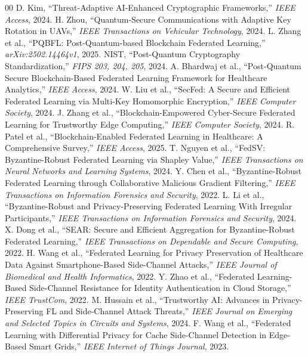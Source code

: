 \documentclass[journal, 10pt, twocolumn]{IEEEtran}
\begin{document}
\begin{thebibliography}{00}
 D. Kim, ``Threat-Adaptive AI-Enhanced Cryptographic Frameworks,'' \textit{IEEE Access}, 2024.
 H. Zhou, ``Quantum-Secure Communications with Adaptive Key Rotation in UAVs,'' \textit{IEEE Transactions on Vehicular Technology}, 2024.
 L. Zhang et al., ``PQBFL: Post-Quantum-based Blockchain Federated Learning,'' \textit{arXiv:2502.14464v1}, 2025.
 NIST, ``Post-Quantum Cryptography Standardization,'' \textit{FIPS 203, 204, 205}, 2024.
 A. Bhardwaj et al., ``Post-Quantum Secure Blockchain-Based Federated Learning Framework for Healthcare Analytics,'' \textit{IEEE Access}, 2024.
 W. Liu et al., ``SecFed: A Secure and Efficient Federated Learning via Multi-Key Homomorphic Encryption,'' \textit{IEEE Computer Society}, 2024.
 J. Zhang et al., ``Blockchain-Empowered Cyber-Secure Federated Learning for Trustworthy Edge Computing,'' \textit{IEEE Computer Society}, 2024.
 R. Patel et al., ``Blockchain-Enabled Federated Learning in Healthcare: A Comprehensive Survey,'' \textit{IEEE Access}, 2025.
 T. Nguyen et al., ``FedSV: Byzantine-Robust Federated Learning via Shapley Value,'' \textit{IEEE Transactions on Neural Networks and Learning Systems}, 2024.
 Y. Chen et al., ``Byzantine-Robust Federated Learning through Collaborative Malicious Gradient Filtering,'' \textit{IEEE Transactions on Information Forensics and Security}, 2022.
 L. Li et al., ``Byzantine-Robust and Privacy-Preserving Federated Learning With Irregular Participants,'' \textit{IEEE Transactions on Information Forensics and Security}, 2024.
 X. Dong et al., ``SEAR: Secure and Efficient Aggregation for Byzantine-Robust Federated Learning,'' \textit{IEEE Transactions on Dependable and Secure Computing}, 2022.
 H. Wang et al., ``Federated Learning for Privacy Preservation of Healthcare Data Against Smartphone-Based Side-Channel Attacks,'' \textit{IEEE Journal of Biomedical and Health Informatics}, 2022.
 Y. Zhao et al., ``Federated Learning-Based Side-Channel Resistance for Identity Authentication in Cloud Storage,'' \textit{IEEE TrustCom}, 2022.
 M. Hussain et al., ``Trustworthy AI: Advances in Privacy-Preserving FL and Side-Channel Attack Threats,'' \textit{IEEE Journal on Emerging and Selected Topics in Circuits and Systems}, 2024.
 F. Wang et al., ``Federated Learning with Differential Privacy for Cache Side-Channel Detection in Edge-Based Smart Grids,'' \textit{IEEE Internet of Things Journal}, 2023.
\end{thebibliography}
\end{document}
